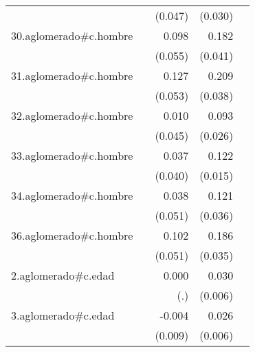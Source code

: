 {\begin{longtable}{l*{4}{D{.}{.}{-1}}}
            &                     &     (0.047)         &     (0.030)         &                     \\
\addlinespace
30.aglomerado#c.hombre&                     &       0.098         &       0.182\sym{***}&                     \\
            &                     &     (0.055)         &     (0.041)         &                     \\
\addlinespace
31.aglomerado#c.hombre&                     &       0.127\sym{*}  &       0.209\sym{***}&                     \\
            &                     &     (0.053)         &     (0.038)         &                     \\
\addlinespace
32.aglomerado#c.hombre&                     &       0.010         &       0.093\sym{***}&                     \\
            &                     &     (0.045)         &     (0.026)         &                     \\
\addlinespace
33.aglomerado#c.hombre&                     &       0.037         &       0.122\sym{***}&                     \\
            &                     &     (0.040)         &     (0.015)         &                     \\
\addlinespace
34.aglomerado#c.hombre&                     &       0.038         &       0.121\sym{***}&                     \\
            &                     &     (0.051)         &     (0.036)         &                     \\
\addlinespace
36.aglomerado#c.hombre&                     &       0.102\sym{*}  &       0.186\sym{***}&                     \\
            &                     &     (0.051)         &     (0.035)         &                     \\
\addlinespace
2.aglomerado#c.edad&                     &       0.000         &       0.030\sym{***}&                     \\
            &                     &         (.)         &     (0.006)         &                     \\
\addlinespace
3.aglomerado#c.edad&                     &      -0.004         &       0.026\sym{***}&                     \\
            &                     &     (0.009)         &     (0.006)         &                     \\

\end{longtable}}
